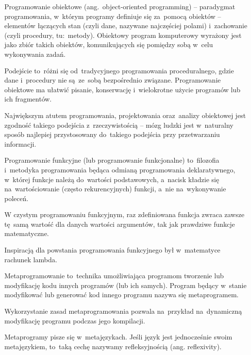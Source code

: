 \begin{definition} \label{definicje.inz_op.jez_obj}
Programowanie obiektowe (ang.~object-oriented programming) -- paradygmat programowania, w~którym programy definiuje się za~pomocą obiektów -- elementów łączących stan (czyli dane, nazywane najczęściej polami) i~zachowanie (czyli procedury, tu:~metody). Obiektowy program komputerowy wyrażony jest jako zbiór takich obiektów, komunikujących się pomiędzy sobą w~celu wykonywania zadań.


Podejście to~różni się od~tradycyjnego programowania proceduralnego, gdzie dane i~procedury nie są~ze~sobą bezpośrednio związane. Programowanie obiektowe ma ułatwić pisanie, konserwację i~wielokrotne użycie programów lub ich fragmentów.


Największym atutem programowania, projektowania oraz~analizy obiektowej jest zgodność takiego podejścia z~rzeczywistością -- mózg ludzki jest w~naturalny sposób najlepiej przystosowany do~takiego podejścia przy przetwarzaniu informacji.\cite{lang}
\end{definition}

\begin{definition} \label{definicje.inz_op.jez_fun}
Programowanie funkcyjne (lub programowanie funkcjonalne) to~filozofia i~metodyka programowania będąca odmianą programowania deklaratywnego, w~której funkcje należą do~wartości podstawowych, a~nacisk kładzie się na~wartościowanie (często rekurencyjnych) funkcji, a~nie na~wykonywanie poleceń.


W czystym programowaniu funkcyjnym, raz zdefiniowana funkcja zwraca zawsze tę~samą wartość dla danych wartości argumentów, tak jak prawdziwe funkcje matematyczne.


Inspiracją dla powstania programowania funkcyjnego był w~matematyce rachunek lambda.\cite{lang}
\end{definition}

\begin{definition}[Metaprogramowanie] \label{definicje.inz_op.metaprog}
Metaprogramowanie to~technika umożliwiająca programom tworzenie lub modyfikację kodu innych programów (lub ich samych). Program będący w~stanie modyfikować lub generować kod innego programu nazywa się metaprogramem.


Wykorzystanie zasad metaprogramowania pozwala na~przykład na~dynamiczną modyfikację programu podczas jego kompilacji.


Metaprogramy pisze się w~metajęzykach. Jeśli język jest jednocześnie swoim metajęzykiem, to~taką cechę nazywamy refleksyjnością (ang. reflexivity).\cite{lang}
\end{definition}

